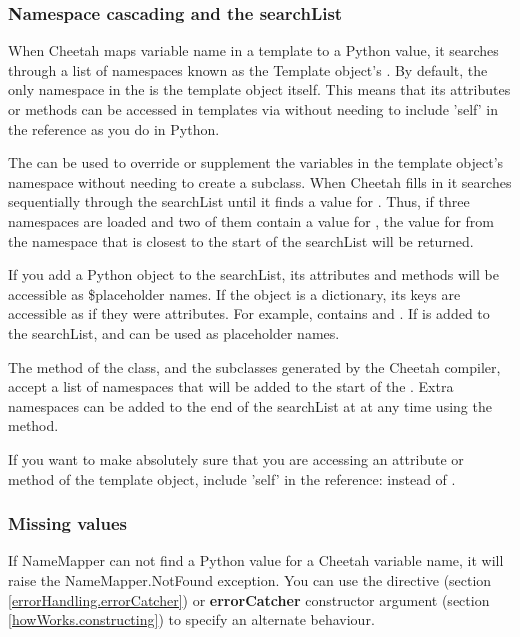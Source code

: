 \subsubsection{Namespace cascading and the searchList}
\label{language.namemapper.searchList}

When Cheetah maps variable name in a template to a Python value, it searches
through a list of namespaces known as the Template object's .
By default, the only namespace in the  is the template object
itself. This means that its attributes or methods can be accessed in templates
via  without needing to include 'self' in the reference as
you do in Python. 


The  can be used to override or supplement the variables in the
template object's namespace without needing to create a subclass.  When Cheetah
fills in  it searches sequentially through the searchList until it
finds a value for .  Thus, if three namespaces are loaded and two of
them contain a value for , the value for  from the
namespace that is closest to the start of the searchList will be returned.

If you add a Python object to the searchList, its attributes and methods will
be accessible as \$placeholder names.  If the object is a dictionary, its keys
are accessible as if they were attributes.  For example, 
contains  and .  If  is added to
the searchList,  and  can be used as
placeholder names.

The method of the  class, and the subclasses
generated by the Cheetah compiler, accept a list of namespaces that will be
added to the start of the .  Extra namespaces can be added to
the end of the searchList at at any time using the
 method.

If you want to make absolutely sure that you are accessing an attribute or
method of the template object, include 'self' in the reference:
 instead of .

\subsubsection{Missing values}
\label{language.namemapper.missing}

If NameMapper can not find a Python value for a Cheetah variable name, it will
raise the NameMapper.NotFound exception.  You can use the 
directive (section \ref{errorHandling.errorCatcher}) or {\bf errorCatcher }
constructor argument (section \ref{howWorks.constructing}) to specify an
alternate behaviour.

